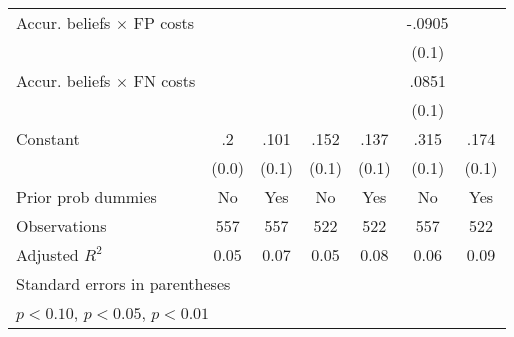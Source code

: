 \begin{table}[htbp]
\begin{tabular}{l*{6}{c}}
Accur. beliefs $\times$ FP costs&                  &                  &                  &                  &   -.0905         &                  \\
                &                  &                  &                  &                  &    (0.1)         &                  \\
Accur. beliefs $\times$ FN costs&                  &                  &                  &                  &    .0851         &                  \\
                &                  &                  &                  &                  &    (0.1)         &                  \\
Constant        &       .2\sym{***}&     .101         &     .152\sym{***}&     .137         &     .315\sym{***}&     .174\sym{*}  \\
                &    (0.0)         &    (0.1)         &    (0.1)         &    (0.1)         &    (0.1)         &    (0.1)         \\
Prior prob dummies &       No         &      Yes         &       No         &      Yes         &       No         &      Yes         \\
\hline
Observations    &      557         &      557         &      522         &      522         &      557         &      522         \\
Adjusted \(R^{2}\)&     0.05         &     0.07         &     0.05         &     0.08         &     0.06         &     0.09         \\
\hline\hline
\multicolumn{7}{l}{\footnotesize Standard errors in parentheses}\\
\multicolumn{7}{l}{\footnotesize \sym{*} \(p<0.10\), \sym{**} \(p<0.05\), \sym{***} \(p<0.01\)}\\
\end{tabular}
\end{table}
